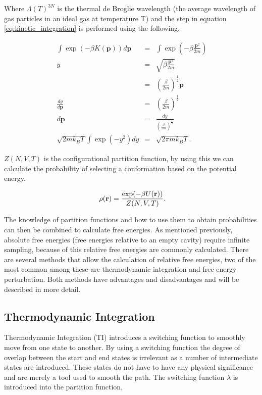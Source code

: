Where $\Lambda(T)^{3N}$ is the thermal de Broglie wavelength (the average wavelength of gas particles in an ideal gas at temperature T) and the step in equation \ref{eq:kinetic_integration} is performed using the following,

\begin{eqnarray}
\ \int \exp (-\beta K (\mathbf{p}))d \mathbf{p} &=& \int \exp \left(- \beta \frac{\mathbf{p}^2}{2m} \right) \\
\ y &=& \sqrt{\beta \frac{\mathbf{p}^2}{2m}} \\
\ &=& \left( \frac{\beta}{2m} \right)^{\frac{1}{2}} \mathbf{p} \\
\ \frac{dy}{d\mathbf{p}} &=& \left( \frac{\beta}{2m} \right)^{\frac{1}{2}} \\
\ d\mathbf{p} &=& \frac{dy}{\left( \frac{\beta}{2m} \right)^{\frac{1}{2}}} \\
\ \sqrt{2m k_B T}\int \exp ( -y^2)dy &=& \sqrt{2 \pi m k_B T} .
\end{eqnarray}


 $Z(N,V,T)$ is the configurational partition function, by using this we can calculate the probability of selecting a conformation based on the potential energy.

\begin{equation}
\ \rho(\mathbf{r})= \frac{\exp (-\beta U(\mathbf{r}))}{Z(N,V,T)} \\.
\end{equation}

The knowledge of partition functions and how to use them to obtain probabilities can then be combined to calculate free energies.  As mentioned previously, absolute free energies (free energies relative to an empty cavity) require infinite sampling, because of this relative free energies are commonly calculated.  There are several methods that allow the calculation of relative free energies, two of the most common among these are thermodynamic integration and free energy perturbation.  Both methods have advantages and disadvantages and will be described in more detail.

\subsection{Thermodynamic Integration}

Thermodynamic Integration (TI) introduces a switching function to smoothly move from one state to another.  By using a switching function the degree of overlap between the start and end states is irrelevant as a number of intermediate states are introduced.  These states do not have to have any physical significance and are merely a tool used to smooth the path.  The switching function $\lambda$ is introduced into the partition function,


